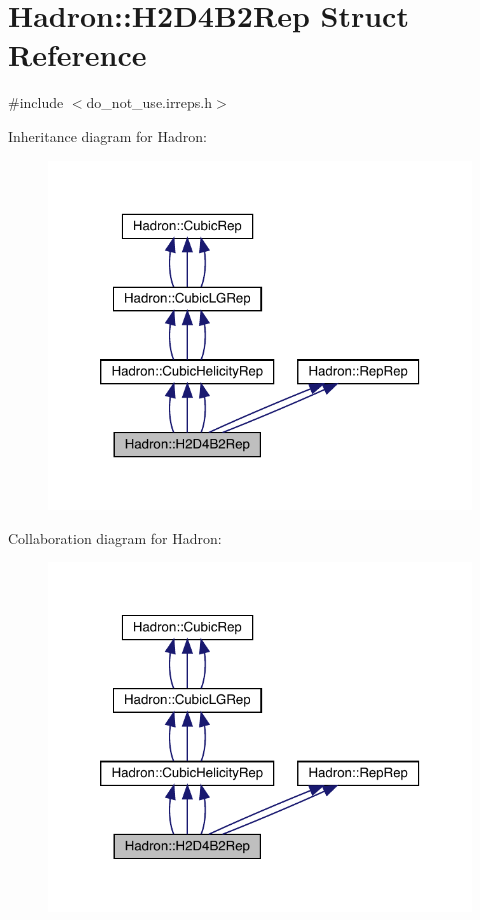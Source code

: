 \hypertarget{structHadron_1_1H2D4B2Rep}{}\section{Hadron\+:\+:H2\+D4\+B2\+Rep Struct Reference}
\label{structHadron_1_1H2D4B2Rep}


{\ttfamily \#include $<$do\+\_\+not\+\_\+use.\+irreps.\+h$>$}



Inheritance diagram for Hadron\+:
\nopagebreak
\begin{figure}[H]
\begin{center}
\leavevmode
\includegraphics[width=320pt]{df/dbb/structHadron_1_1H2D4B2Rep__inherit__graph}
\end{center}
\end{figure}


Collaboration diagram for Hadron\+:
\nopagebreak
\begin{figure}[H]
\begin{center}
\leavevmode
\includegraphics[width=320pt]{dc/dcf/structHadron_1_1H2D4B2Rep__coll__graph}
\end{center}
\end{figure}
